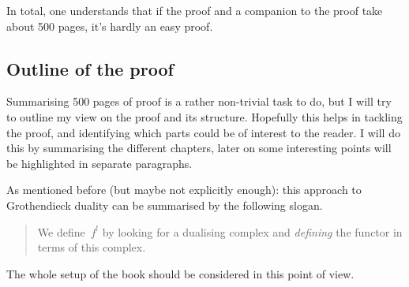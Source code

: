 \documentclass[10pt,a4paper]{article}
\begin{document}
In total, one understands that if the proof and a companion to the proof take about 500 pages, it's hardly an easy proof.

\subsection{Outline of the proof}
Summarising 500 pages of proof is a rather non-trivial task to do, but I will try to outline my view on the proof and its structure. Hopefully this helps in tackling the proof, and identifying which parts could be of interest to the reader. I will do this by summarising the different chapters, later on some interesting points will be highlighted in separate paragraphs.

As mentioned before (but maybe not explicitly enough): this approach to Grothendieck duality can be summarised by the following slogan.
\begin{quote}
  We define~$f^!$ by looking for a dualising complex and \emph{defining} the functor in terms of this complex.
\end{quote}
The whole setup of the book should be considered in this point of view.
\end{document}
